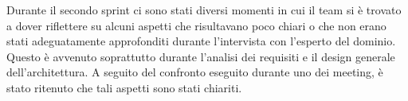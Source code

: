 Durante il secondo sprint ci sono stati diversi momenti in cui il team si è trovato a dover riflettere su alcuni aspetti che risultavano poco chiari o che non erano stati adeguatamente approfonditi durante l'intervista con l'esperto del dominio. Questo è avvenuto soprattutto durante l'analisi dei requisiti e il design generale dell'architettura. A seguito del confronto eseguito durante uno dei meeting, è stato ritenuto che tali aspetti sono stati chiariti.